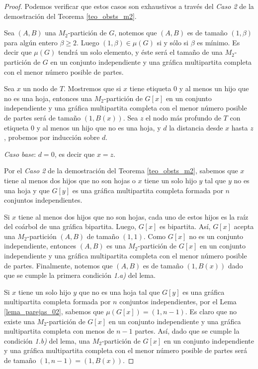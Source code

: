 \begin{proof}

Podemos verificar que estos casos son exhaustivos a través del \emph{Caso 2} de la demostración del Teorema \ref{teo_obsts_m2}.

Sea $(A,B)$ una $M_2$-partición de $G$, notemos que $(A,B)$ es de tamaño $(1,\beta)$ para algún entero $\beta \geq 2$. Luego $(1,\beta)\in \mu(G)$ si y sólo si $\beta$ es mínimo. Es decir que $\mu(G)$ tendrá un solo elemento, y éste será el tamaño de una $M_2$-partición de $G$ en un conjunto independiente y una gráfica multipartita completa con el menor número posible de partes.

Sea $x$ un nodo de $T$. Mostremos que si $x$ tiene etiqueta 0 y al menos un hijo que no es una hoja, entonces una $M_2$-partición de $G[x]$ en un conjunto independiente y una gráfica multipartita completa con el menor número posible de partes será de tamaño $(1,B(x))$. Sea $z$ el nodo más profundo de $T$ con etiqueta 0 y al menos un hijo que no es una hoja, y $d$ la distancia desde $x$ hasta $z$, probemos por inducción sobre $d$.

\emph{Caso base}: $d = 0$, es decir que $x = z$.

Por el \emph{Caso 2} de la demostración del Teorema \ref{teo_obsts_m2}, sabemos que $x$ tiene al menos dos hijos que no son hojas o $x$ tiene un solo hijo $y$ tal que $y$ no es una hoja y que $G[y]$ es una gráfica multipartita completa formada por $n$ conjuntos independientes.

Si $x$ tiene al menos dos hijos que no son hojas, cada uno de estos hijos es la raíz del coárbol de una gráfica bipartita. Luego, $G[x]$ es bipartita. Así, $G[x]$ acepta una $M_2$-partición $(A,B)$ de tamaño $(1,1)$. Como $G[x]$ no es un conjunto independiente, entonces $(A,B)$ es una $M_2$-partición de $G[x]$ en un conjunto independiente y una gráfica multipartita completa con el menor número posible de partes. Finalmente, notemos que $(A,B)$ es de tamaño $(1,B(x))$ dado que se cumple la primera condición \emph{1.a)} del lema.

Si $x$ tiene un solo hijo $y$ que no es una hoja tal que $G[y]$ es una gráfica multipartita completa formada por $n$ conjuntos independientes, por el Lema \ref{lema_parejas_02}, sabemos que $\mu(G[x]) = (1,n-1)$. Es claro que no existe una $M_2$-partición de $G[x]$ en un conjunto independiente y una gráfica multipartita completa con menos de $n-1$ partes. Así, dado que se cumple la condición \emph{1.b)} del lema, una $M_2$-partición de $G[x]$ en un conjunto independiente y una gráfica multipartita completa con el menor número posible de partes será de tamaño $(1,n-1)=(1,B(x))$.


\end{proof}
